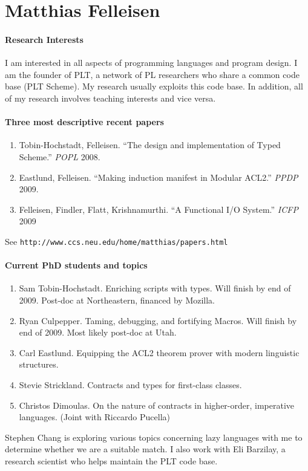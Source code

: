 \documentclass[11pt]{article}
\begin{document}
\section*{Matthias Felleisen}

\paragraph{Research Interests} I am interested in all aspects of
 programming languages and program design. I am the founder of PLT, a
 network of PL researchers who share a common code base (PLT Scheme). My
 research usually exploits this code base. In addition, all of my research
 involves teaching interests and vice versa.

\paragraph{Three most descriptive recent papers} 
\begin{enumerate}
\item Tobin-Hochstadt, Felleisen. ``The design and
implementation of Typed Scheme.'' {\it POPL\/} 2008. 

\item Eastlund, Felleisen. ``Making induction manifest in
Modular ACL2.'' {\it PPDP\/} 2009. 

\item Felleisen, Findler, Flatt, Krishnamurthi. ``A Functional I/O
System.'' {\it ICFP\/} 2009 
\end{enumerate}
 See {\tt http://www.ccs.neu.edu/home/matthias/papers.html}

\paragraph{Current PhD students and topics} 
\begin{enumerate}
\item Sam Tobin-Hochstadt. Enriching scripts with types. 
Will finish by end of 2009. Post-doc at Northeastern, financed by Mozilla. 

\item Ryan Culpepper. Taming, debugging, and fortifying Macros. 
Will finish by end of 2009. Most likely post-doc at Utah. 

\item Carl Eastlund. Equipping the ACL2 theorem prover with modern
linguistic structures. 

\item Stevie Strickland. Contracts and types for first-class classes. 

\item Christos Dimoulas. On the nature of contracts in higher-order,
imperative languages. (Joint with Riccardo Pucella)
\end{enumerate}
 Stephen Chang is exploring various topics concerning lazy languages with
 me to determine whether we are a suitable match. I also work with Eli
 Barzilay, a research scientist who helps maintain the PLT code base. 
\end{document}
